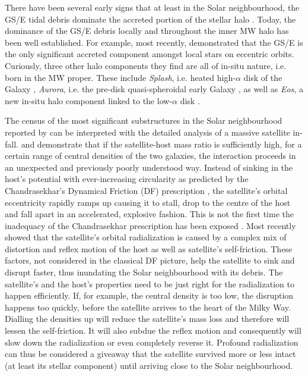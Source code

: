 \documentclass[a4paper,useAMS,usenatbib]{mnras}
\begin{document}
There have been several early signs that at least in the Solar neighbourhood, the GS/E tidal debris dominate the accreted portion of the stellar halo \citep[e.g.][]{Brook2003,Meza2005,Nissen2010}. Today, the dominance of the GS/E debris locally and throughout the inner MW halo has been well established. For example, most recently, \citet{Myeong2022} demonstrated that the GS/E is the only significant accreted component amongst local stars on eccentric orbits. Curiously, three other halo components they find are all of in-situ nature, i.e. born in the MW proper. These include {\it Splash}, i.e. heated high-$\alpha$ disk of the Galaxy \citep[][]{Bonaca2017,Gallart2019,Dimatteo2019,Belokurov2020}, {\it Aurora}, i.e. the pre-disk quasi-spheroidal early Galaxy \citep[][]{Aurora,Conroy2022}, as well as {\it Eos}, a new in-situ halo component linked to the low-$\alpha$ disk \citep[see][]{Myeong2022}.

The census of the most significant substructures in the Solar neighbourhood reported by \citet{Myeong2022} can be interpreted with the detailed analysis of a massive satellite in-fall. \citet{Amorisco2017} and \citet{Vasiliev2022} demonstrate that if the satellite-host mass ratio is sufficiently high, for a certain range of central densities of the two galaxies, the interaction proceeds in an unexpected and previously poorly understood way. Instead of sinking in the host's potential with ever-increasing circularity as predicted by the Chandrasekhar's Dynamical Friction (DF) prescription \citep[][]{Chandra1943,Jorge2004}, the satellite's orbital eccentricity rapidly ramps up causing it to stall, drop to the centre of the host and fall apart in an accelerated, explosive fashion. This is not the first time the inadequacy of the Chandrasekhar prescription has been exposed \citep[see e.g.][for interactions with disks and spirals]{Quinn1986}. Most recently \citet{Vasiliev2022} showed that the satellite's orbital radialization is caused by a complex mix of distortion and reflex motion of the host as well as satellite's self-friction. These factors, not considered in the classical DF picture, help the satellite to sink and disrupt faster, thus inundating the Solar neighbourhood with its debris. The satellite's and the host's properties need to be just right for the radialization to happen efficiently. If, for example, the central density is too low, the disruption happens too quickly, before the satellite arrives to the heart of the Milky Way. Dialling the densities up will reduce the satellite's mass loss and therefore will lessen the self-friction. It will also subdue the reflex motion and consequently will slow down the radialization or even completely reverse it. Profound radialization can thus be considered a giveaway that the satellite survived more or less intact (at least its stellar component) until arriving close to the Solar neighbourhood. 
\end{document}
